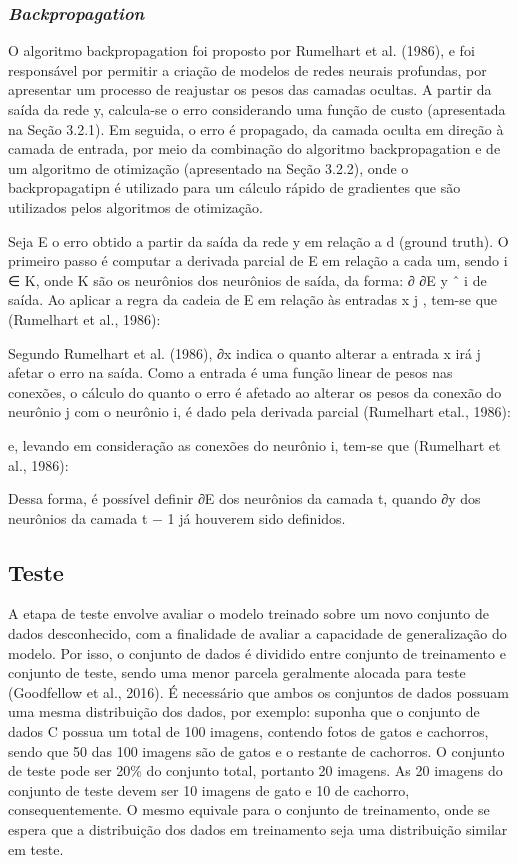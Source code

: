 \subsubsection{\textit{Backpropagation}}
O algoritmo backpropagation foi proposto por Rumelhart et al. (1986), e foi responsável por permitir a criação de modelos de redes neurais profundas, por apresentar um processo de reajustar os pesos das camadas ocultas. A partir da saída da rede y, calcula-se o erro considerando uma função de custo (apresentada na Seção 3.2.1). Em seguida, o erro é propagado, da camada oculta em direção à camada de entrada, por meio da combinação do algoritmo backpropagation e de um algoritmo de otimização (apresentado na Seção 3.2.2), onde o backpropagatipn é utilizado para um cálculo rápido de gradientes que são utilizados pelos algoritmos de otimização.

Seja E o erro obtido a partir da saída da rede y em relação a d (ground truth). O primeiro passo é computar a derivada parcial de E em relação a cada um, sendo i ∈ K, onde K são os neurônios dos neurônios de saída, da forma: ∂ ∂E y ˆ i de saída. Ao aplicar a regra da cadeia de E em relação às entradas x j , tem-se que (Rumelhart et al., 1986):

Segundo Rumelhart et al. (1986), ∂x indica o quanto alterar a entrada x irá j afetar o erro na saída. Como a entrada é uma função linear de pesos nas conexões, o cálculo do quanto o erro é afetado ao alterar os pesos da conexão do neurônio j com o neurônio i, é dado pela derivada parcial (Rumelhart etal., 1986):

e, levando em consideração as conexões do neurônio i, tem-se que (Rumelhart et al., 1986):

Dessa forma, é possível definir ∂E dos neurônios da camada t, quando ∂y dos neurônios da camada t − 1 já houverem sido definidos.


\subsection{Teste}

A etapa de teste envolve avaliar o modelo treinado sobre um novo conjunto de dados desconhecido, com a finalidade de avaliar a capacidade de generalização do modelo. Por isso, o conjunto de dados é dividido entre conjunto de treinamento e conjunto de teste, sendo uma menor parcela geralmente alocada para teste (Goodfellow et al., 2016). É necessário que ambos os conjuntos de dados possuam uma mesma distribuição dos dados, por exemplo: suponha que o conjunto de dados C possua um total de 100 imagens, contendo fotos de gatos e cachorros, sendo que 50 das 100 imagens são de gatos e o restante de cachorros. O conjunto de teste pode ser 20\% do conjunto total, portanto 20 imagens. As 20 imagens do conjunto de teste devem ser 10 imagens de gato e 10 de cachorro, consequentemente. O mesmo equivale para o conjunto de treinamento, onde se espera que a distribuição dos dados em treinamento seja uma distribuição similar em teste.

